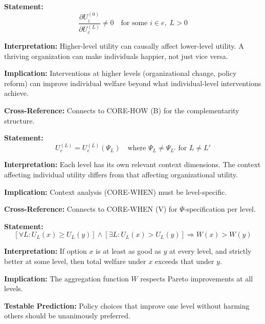 \begin{tcolorbox}[colback=gray!5!white, colframe=gray!75!black,
    title=Axiom SRL-4: Downward Causation]
\textbf{Statement:}
\begin{equation}
\frac{\partial U_i^{(0)}}{\partial U_e^{(L)}} \neq 0 \quad \text{for some } i \in e, \; L > 0
\end{equation}

\textbf{Interpretation:} Higher-level utility can causally affect lower-level utility.
A thriving organization can make individuals happier, not just vice versa.

\textbf{Implication:} Interventions at higher levels (organizational change, policy reform)
can improve individual welfare beyond what individual-level interventions achieve.

\textbf{Cross-Reference:} Connects to CORE-HOW (B) for the complementarity structure.
\end{tcolorbox}

\begin{tcolorbox}[colback=gray!5!white, colframe=gray!75!black,
    title=Axiom SRL-5: Level-Specific Context]
\textbf{Statement:}
\begin{equation}
U_e^{(L)} = U_e^{(L)}(\Psi_L) \quad \text{where } \Psi_L \neq \Psi_{L'} \text{ for } L \neq L'
\end{equation}

\textbf{Interpretation:} Each level has its own relevant context dimensions.
The context affecting individual utility differs from that affecting organizational utility.

\textbf{Implication:} Context analysis (CORE-WHEN) must be level-specific.

\textbf{Cross-Reference:} Connects to CORE-WHEN (V) for $\Psi$-specification per level.
\end{tcolorbox}

\begin{tcolorbox}[colback=gray!5!white, colframe=gray!75!black,
    title=Axiom SRL-6: Pareto Consistency]
\textbf{Statement:}
\begin{equation}
\left[ \forall L: U_L(x) \geq U_L(y) \right] \land \left[ \exists L: U_L(x) > U_L(y) \right] \Rightarrow W(x) > W(y)
\end{equation}

\textbf{Interpretation:} If option $x$ is at least as good as $y$ at every level, and strictly
better at some level, then total welfare under $x$ exceeds that under $y$.

\textbf{Implication:} The aggregation function $W$ respects Pareto improvements at all levels.

\textbf{Testable Prediction:} Policy choices that improve one level without harming others
should be unanimously preferred.
\end{tcolorbox}

